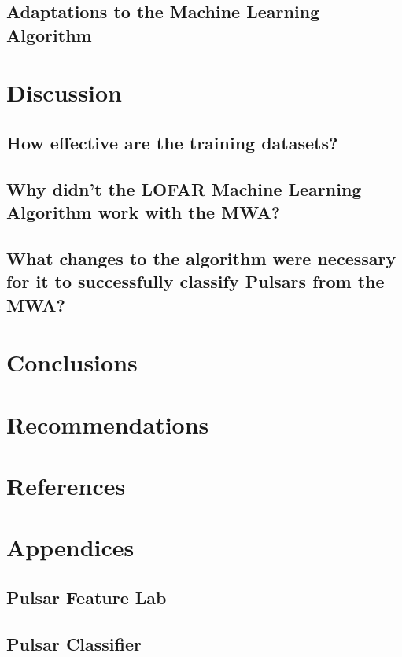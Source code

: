 \documentclass{article}
\begin{document}
\subsection{Adaptations to the Machine Learning Algorithm}

\pagebreak
\section{Discussion}
\subsection{How effective are the training datasets?}
\subsection{Why didn't the LOFAR Machine Learning Algorithm work with the MWA?}
\subsection{What changes to the algorithm were necessary for it to successfully classify Pulsars from the MWA?}

\pagebreak
\section{Conclusions}

\section{Recommendations}

\pagebreak
\section{References}
\printbibliography[heading=none]

\pagebreak
\section{Appendices}
\subsection{Pulsar Feature Lab}
\subsection{Pulsar Classifier}

\end{document}
